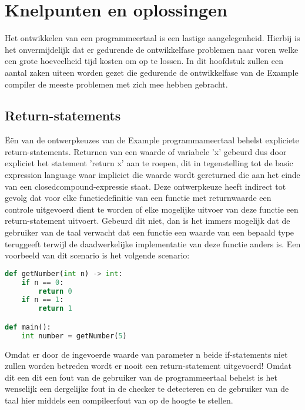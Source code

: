 \chapter{Knelpunten en oplossingen}
Het ontwikkelen van een programmeertaal is een lastige aangelegenheid. Hierbij is het onvermijdelijk dat er gedurende de ontwikkelfase problemen naar voren welke een grote hoeveelheid tijd kosten om op te lossen. In dit hoofdstuk zullen een aantal zaken uiteen worden gezet die gedurende de ontwikkelfase van de Example compiler de meeste problemen met zich mee hebben gebracht.

\section{Return-statements}
\"{E}\"{e}n van de ontwerpkeuzes van de Example programmameertaal behelst expliciete return-statements. Returnen van een waarde of variabele 'x' gebeurd dus door expliciet het statement 'return x' aan te roepen, dit in tegenstelling tot de basic expression language waar impliciet die waarde wordt gereturned die aan het einde van een closedcompound-expressie staat. Deze ontwerpkeuze heeft indirect tot gevolg dat voor elke functiedefinitie van een functie met returnwaarde een controle uitgevoerd dient te worden of elke mogelijke uitvoer van deze functie een return-statement uitvoert. Gebeurd dit niet, dan is het immers mogelijk dat de gebruiker van de taal verwacht dat een functie een waarde van een bepaald type teruggeeft terwijl de daadwerkelijke implementatie van deze functie anders is. Een voorbeeld van dit scenario is het volgende scenario:
\begin{lstlisting}[language=Python]
def getNumber(int n) -> int:
	if n == 0:
		return 0
    if n == 1:
        return 1

def main():
    int number = getNumber(5)
\end{lstlisting}
Omdat er door de ingevoerde waarde van parameter n beide if-statements niet zullen worden betreden wordt er nooit een return-statement uitgevoerd! Omdat dit een dit een fout van de gebruiker van de programmeertaal behelst is het wenselijk een dergelijke fout in de checker te detecteren en de gebruiker van de taal hier middels een compileerfout van op de hoogte te stellen. 


